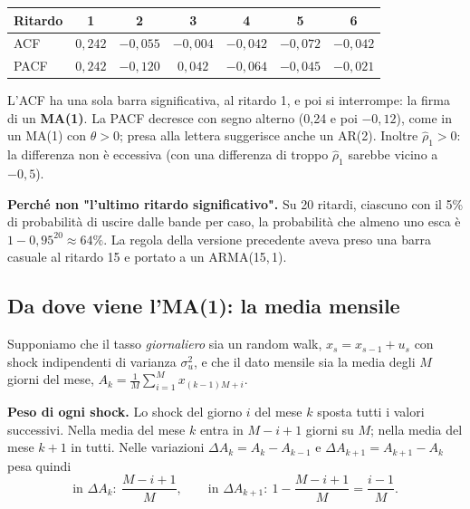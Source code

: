 \documentclass[11pt,a4paper]{article}
\begin{document}
\begin{table}[H]
\centering
\begin{tabular}{lcccccc}
\toprule
Ritardo & 1 & 2 & 3 & 4 & 5 & 6 \\
\midrule
ACF & $0{,}242$ & $-0{,}055$ & $-0{,}004$ & $-0{,}042$ & $-0{,}072$ & $-0{,}042$ \\
PACF & $0{,}242$ & $-0{,}120$ & $0{,}042$ & $-0{,}064$ & $-0{,}045$ & $-0{,}021$ \\
\bottomrule
\end{tabular}
\end{table}

L'ACF ha una sola barra significativa, al ritardo 1, e poi si interrompe: la firma di un \textbf{MA(1)}. La PACF decresce con segno alterno (0,24 e poi $-0{,}12$), come in un MA(1) con $\theta > 0$; presa alla lettera suggerisce anche un AR(2). Inoltre $\hat\rho_1 > 0$: la differenza non è eccessiva (con una differenza di troppo $\hat\rho_1$ sarebbe vicino a $-0{,}5$).

\begin{nota}
\textbf{Perché non "l'ultimo ritardo significativo".} Su 20 ritardi, ciascuno con il 5\% di probabilità di uscire dalle bande per caso, la probabilità che almeno uno esca è $1 - 0{,}95^{20} \approx 64\%$. La regola della versione precedente aveva preso una barra casuale al ritardo 15 e portato a un ARMA(15,\,1).
\end{nota}

\subsection{Da dove viene l'MA(1): la media mensile}

Supponiamo che il tasso \emph{giornaliero} sia un random walk, $x_s = x_{s-1} + u_s$ con shock indipendenti di varianza $\sigma_u^2$, e che il dato mensile sia la media degli $M$ giorni del mese, $A_k = \frac1M\sum_{i=1}^M x_{(k-1)M+i}$.

\textbf{Peso di ogni shock.} Lo shock del giorno $i$ del mese $k$ sposta tutti i valori successivi. Nella media del mese $k$ entra in $M - i + 1$ giorni su $M$; nella media del mese $k+1$ in tutti. Nelle variazioni $\Delta A_k = A_k - A_{k-1}$ e $\Delta A_{k+1} = A_{k+1} - A_k$ pesa quindi
\[
\text{in } \Delta A_k:\ \frac{M-i+1}{M}, \qquad \text{in } \Delta A_{k+1}:\ 1 - \frac{M-i+1}{M} = \frac{i-1}{M}.
\]
\end{document}
